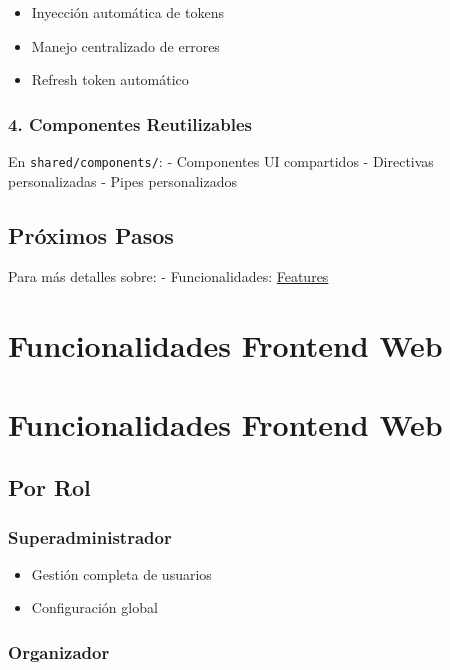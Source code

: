 \documentclass[
  spanish,
  11pt,
  letterpaper,
]{book}
\providecommand{\tightlist}{%
  \setlength{\itemsep}{0pt}\setlength{\parskip}{0pt}}
\begin{document}
\begin{itemize}
\tightlist
\item
  Inyección automática de tokens
\item
  Manejo centralizado de errores
\item
  Refresh token automático
\end{itemize}

\subsection{4. Componentes
Reutilizables}\label{componentes-reutilizables}

En \texttt{shared/components/}: - Componentes UI compartidos -
Directivas personalizadas - Pipes personalizados

\section{Próximos Pasos}\label{pruxf3ximos-pasos-6}

Para más detalles sobre: - Funcionalidades:
\href{features.qmd}{Features}

\chapter{Funcionalidades Frontend
Web}\label{funcionalidades-frontend-web}

\chapter{Funcionalidades Frontend
Web}\label{funcionalidades-frontend-web-1}

\section{Por Rol}\label{por-rol}

\subsection{Superadministrador}\label{superadministrador}

\begin{itemize}
\tightlist
\item
  Gestión completa de usuarios
\item
  Configuración global
\end{itemize}

\subsection{Organizador}\label{organizador-1}
\end{document}
